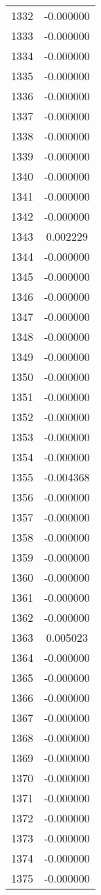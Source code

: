 \documentclass[12pt]{article}
\begin{document}
\begin{longtable}{@{}cc@{}}
1332 & -0.000000 \\
1333 & -0.000000 \\
1334 & -0.000000 \\
1335 & -0.000000 \\
1336 & -0.000000 \\
1337 & -0.000000 \\
1338 & -0.000000 \\
1339 & -0.000000 \\
1340 & -0.000000 \\
1341 & -0.000000 \\
1342 & -0.000000 \\
1343 & 0.002229 \\
1344 & -0.000000 \\
1345 & -0.000000 \\
1346 & -0.000000 \\
1347 & -0.000000 \\
1348 & -0.000000 \\
1349 & -0.000000 \\
1350 & -0.000000 \\
1351 & -0.000000 \\
1352 & -0.000000 \\
1353 & -0.000000 \\
1354 & -0.000000 \\
1355 & -0.004368 \\
1356 & -0.000000 \\
1357 & -0.000000 \\
1358 & -0.000000 \\
1359 & -0.000000 \\
1360 & -0.000000 \\
1361 & -0.000000 \\
1362 & -0.000000 \\
1363 & 0.005023 \\
1364 & -0.000000 \\
1365 & -0.000000 \\
1366 & -0.000000 \\
1367 & -0.000000 \\
1368 & -0.000000 \\
1369 & -0.000000 \\
1370 & -0.000000 \\
1371 & -0.000000 \\
1372 & -0.000000 \\
1373 & -0.000000 \\
1374 & -0.000000 \\
1375 & -0.000000 \\

\end{longtable}
\end{document}
